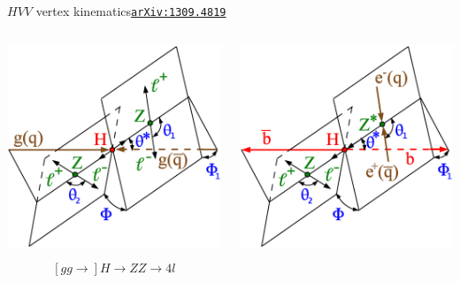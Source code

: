 \documentclass[usenames,dvipsnames,svgnames,table]{beamer}
\newcommand{\arxiv}[1]{\href{http://arxiv.org/abs/#1}{\nolinkurl{arXiv:#1}}}
\newcommand{\snowmass}{\arxiv{1309.4819}}
\begin{document}
\begin{frame}{$HVV$ vertex kinematics}{\snowmass}

\begin{columns} \small
\begin{column}{0.33\textwidth} \centering
\includegraphics[width=\columnwidth]{snowmass/angles-HZZ4l} \\
\[\phantom{equation=ghost}\]
\[\left[gg\to\right] H\to ZZ\to 4l\]
\end{column}
\begin{column}{0.33\textwidth} \centering
\includegraphics[width=\columnwidth]{snowmass/angles-ZZHBB} \\

\end{column}
\end{columns}
\end{frame}
\end{document}
